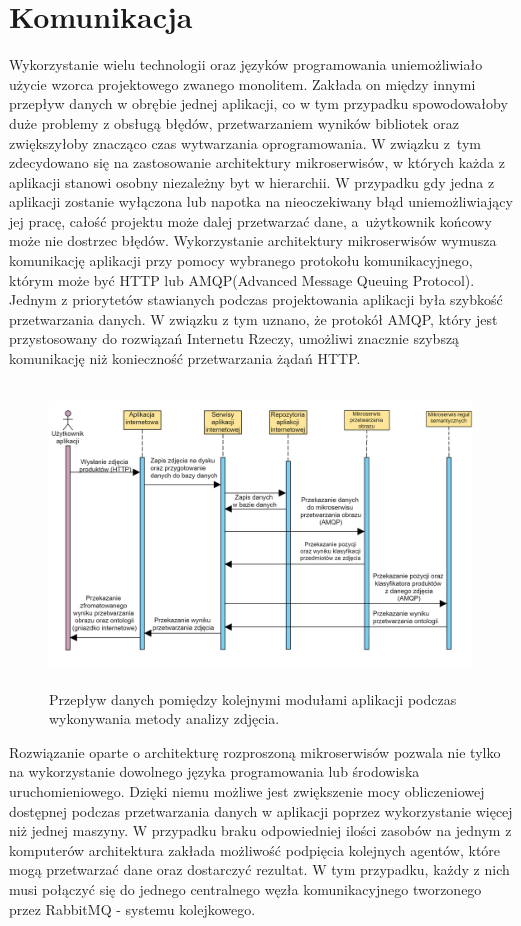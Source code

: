 \section{Komunikacja}
{Wykorzystanie wielu technologii oraz języków programowania uniemożliwiało użycie wzorca projektowego zwanego monolitem. Zakłada on między innymi przepływ danych w obrębie jednej aplikacji, co w tym przypadku spowodowałoby duże problemy z obsługą błędów, przetwarzaniem wyników bibliotek oraz zwiększyłoby znacząco czas wytwarzania oprogramowania. W związku z~tym zdecydowano się na zastosowanie architektury mikroserwisów, w których każda z aplikacji stanowi osobny niezależny byt w hierarchii. W przypadku gdy jedna z aplikacji zostanie wyłączona lub napotka na nieoczekiwany błąd uniemożliwiający jej pracę, całość projektu może dalej przetwarzać dane, a~użytkownik końcowy może nie dostrzec błędów. Wykorzystanie architektury mikroserwisów wymusza komunikację aplikacji przy pomocy wybranego protokołu komunikacyjnego, którym może być HTTP lub AMQP(Advanced Message Queuing Protocol)\cite{AMQP}. Jednym z priorytetów stawianych podczas projektowania aplikacji była szybkość przetwarzania danych. W związku z tym uznano, że protokół AMQP, który jest przystosowany do rozwiązań Internetu Rzeczy, umożliwi znacznie szybszą komunikację niż konieczność przetwarzania żądań HTTP. 
	
	
\begin{figure}[h]
	\centering
	\includegraphics[width=0.9\linewidth,height=8cm]{"images/diagram przeplywu danych"}
	\caption{Przepływ danych pomiędzy kolejnymi modułami aplikacji podczas wykonywania metody analizy zdjęcia.}
	\label{fig:diagram-przeplywu-danych}
\end{figure}
Rozwiązanie oparte o architekturę rozproszoną mikroserwisów pozwala nie tylko na wykorzystanie dowolnego języka programowania lub środowiska uruchomieniowego. Dzięki niemu możliwe jest zwiększenie mocy obliczeniowej dostępnej podczas przetwarzania danych w aplikacji poprzez wykorzystanie więcej niż jednej maszyny. W przypadku braku odpowiedniej ilości zasobów na jednym z komputerów architektura zakłada możliwość podpięcia kolejnych agentów, które mogą przetwarzać dane oraz dostarczyć rezultat. W tym przypadku, każdy z nich musi połączyć się do jednego centralnego węzła komunikacyjnego tworzonego przez RabbitMQ \cite{RabbitMQ} - systemu kolejkowego.



}

